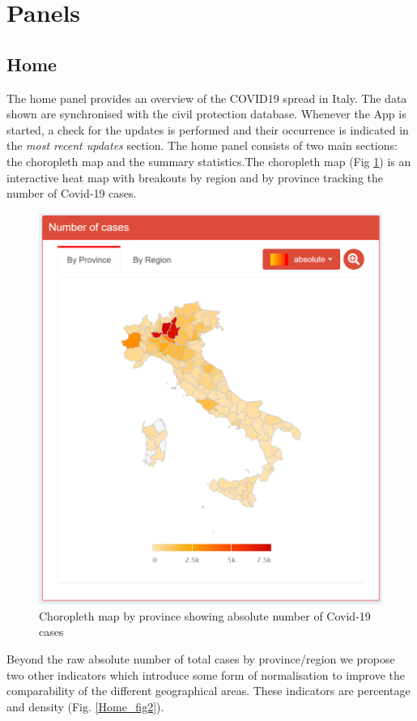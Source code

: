 \documentclass[
12pt, %
a4paper, %
oneside, %
headinclude,footinclude, %
BCOR5mm, %
]{scrartcl}
\begin{document}

\clearpage

\section{Panels} \label{Panels}

\subsection{Home}

The home panel provides an overview of the COVID19 spread in Italy. The data shown are synchronised with the civil protection database. Whenever the App is started,  a check for the updates is performed and their occurrence is indicated in the \textit{ most recent updates }section. The home panel consists of two main sections: the choropleth map and the summary statistics.The choropleth map (Fig \ref{Home_fig1}) is an interactive heat map with breakouts by region and by province tracking the number of Covid-19 cases. 

\begin{figure}[h]
 \centering
 \includegraphics[width=0.5\linewidth]{Figures/Home_figure_1.png} 
 \caption{Choropleth map by province showing absolute number of Covid-19 cases}
 \label{Home_fig1}
\end{figure}

Beyond the raw absolute number of total cases by province/region we propose two other indicators which introduce some form of normalisation to improve the comparability of the different geographical areas. These indicators are percentage and density (Fig. \ref{Home_fig2}).
\end{document}
